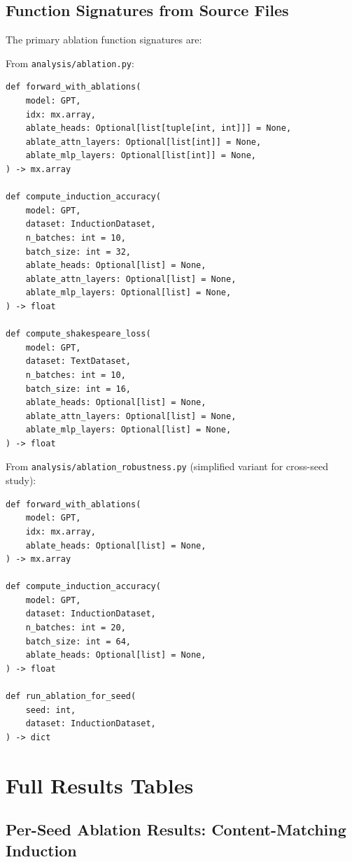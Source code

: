 \subsection{Function Signatures from Source Files}

The primary ablation function signatures are:

From \texttt{analysis/ablation.py}:
\begin{verbatim}
def forward_with_ablations(
    model: GPT,
    idx: mx.array,
    ablate_heads: Optional[list[tuple[int, int]]] = None,
    ablate_attn_layers: Optional[list[int]] = None,
    ablate_mlp_layers: Optional[list[int]] = None,
) -> mx.array

def compute_induction_accuracy(
    model: GPT,
    dataset: InductionDataset,
    n_batches: int = 10,
    batch_size: int = 32,
    ablate_heads: Optional[list] = None,
    ablate_attn_layers: Optional[list] = None,
    ablate_mlp_layers: Optional[list] = None,
) -> float

def compute_shakespeare_loss(
    model: GPT,
    dataset: TextDataset,
    n_batches: int = 10,
    batch_size: int = 16,
    ablate_heads: Optional[list] = None,
    ablate_attn_layers: Optional[list] = None,
    ablate_mlp_layers: Optional[list] = None,
) -> float
\end{verbatim}

From \texttt{analysis/ablation\_robustness.py} (simplified variant for cross-seed study):
\begin{verbatim}
def forward_with_ablations(
    model: GPT,
    idx: mx.array,
    ablate_heads: Optional[list] = None,
) -> mx.array

def compute_induction_accuracy(
    model: GPT,
    dataset: InductionDataset,
    n_batches: int = 20,
    batch_size: int = 64,
    ablate_heads: Optional[list] = None,
) -> float

def run_ablation_for_seed(
    seed: int,
    dataset: InductionDataset,
) -> dict
\end{verbatim}

\clearpage

\section{Full Results Tables}
\label{app:full_results}

\subsection{Per-Seed Ablation Results: Content-Matching Induction}
\label{app:per_seed_ablation}

